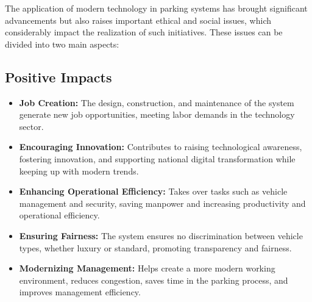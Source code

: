 \documentclass{article}
\begin{document}
\begin{itemize}[label=-]
The application of modern technology in parking systems has brought significant advancements but also raises important ethical and social issues, which considerably impact the realization of such initiatives. These issues can be divided into two main aspects:

\subsection{Positive Impacts}
\begin{itemize}[label=-]
    \item \textbf{Job Creation:} The design, construction, and maintenance of the system generate new job opportunities, meeting labor demands in the technology sector.
    \item \textbf{Encouraging Innovation:} Contributes to raising technological awareness, fostering innovation, and supporting national digital transformation while keeping up with modern trends.
    \item \textbf{Enhancing Operational Efficiency:} Takes over tasks such as vehicle management and security, saving manpower and increasing productivity and operational efficiency.
    \item \textbf{Ensuring Fairness:} The system ensures no discrimination between vehicle types, whether luxury or standard, promoting transparency and fairness.
    \item \textbf{Modernizing Management:} Helps create a more modern working environment, reduces congestion, saves time in the parking process, and improves management efficiency.
\end{itemize}


\end{itemize}
\end{document}

